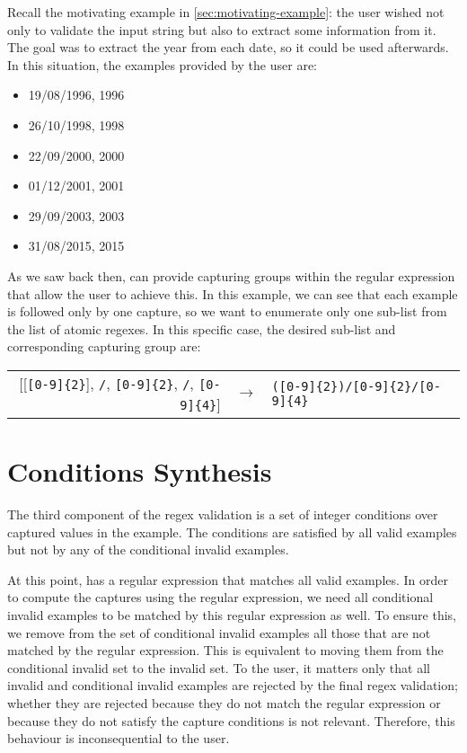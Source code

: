 \begin{example}
Recall the motivating example in \autoref{sec:motivating-example}: the user wished not only to validate the input string but also to extract some information from it. The goal was to extract the year from each date, so it could be used afterwards. In this situation, the examples provided by the user are:
%
\begin{multicols}{3}
    \begin{itemize}[label={}]
    \item 19/08/1996, 1996
    \item 26/10/1998, 1998
    \item 22/09/2000, 2000
    \item 01/12/2001, 2001
    \item 29/09/2003, 2003
    \item 31/08/2015, 2015
    \end{itemize}
\end{multicols}
%
As we saw back then, \Forest can provide capturing groups within the regular expression that allow the user to achieve this. In this example, we can see that each example is followed only by one capture, so we want to enumerate only one sub-list from the list of atomic regexes. In this specific case, the desired sub-list and corresponding capturing group are:
%
\begin{center}
\begin{tabular}{rcl}
[[\verb![0-9]{2}!], \verb!/!, \verb![0-9]{2}!, \verb!/!, \verb![0-9]{4}!] & $\rightarrow$ & \verb!([0-9]{2})/[0-9]{2}/[0-9]{4}!
\end{tabular}\bigskip
\end{center}
\end{example}


\section{Conditions Synthesis}\label{sec:cap_cond_synthesis}
The third component of the regex validation is a set of integer conditions over captured values in the example. The conditions are satisfied by all valid examples but not by any of the conditional invalid examples.

At this point, \Forest has a regular expression that matches all valid examples.
In order to compute the captures using the regular expression, we need all conditional invalid examples to be matched by this regular expression as well.
To ensure this, we remove from the set of conditional invalid examples all those that are not matched by the regular expression. 
This is equivalent to moving them from the conditional invalid set to the invalid set.
To the user, it matters only that all invalid and conditional invalid examples are rejected by the final regex validation; whether they are rejected because they do not match the regular expression or because they do not satisfy the capture conditions is not relevant. Therefore, this behaviour is inconsequential to the user.

